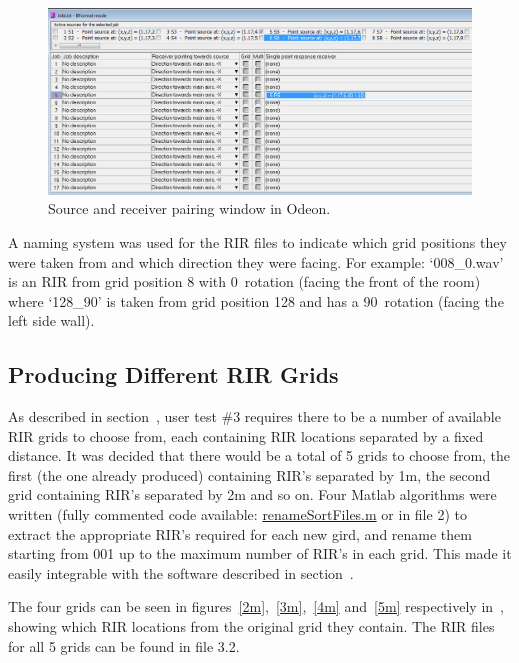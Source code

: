 \documentclass[../../main.tex]{subfiles}
\begin{document}
			\begin{figure}
				\centerline{\includegraphics[scale = 0.54]{Sections/Implementation/Odeon/images/SouRecPos/SouRecSelection_crop.png}}
				\caption{Source and receiver pairing window in Odeon.}
				\label{SouRecPos}
			\end{figure}

			A naming system was used for the \ac{RIR} files to indicate which grid positions they were taken from and which direction they were facing. For example: `008\_0.wav' is an \ac{RIR} from grid position 8 with 0\textdegree~rotation (facing the front of the room) where `128\_90' is taken from grid position 128 and has a 90\textdegree~rotation (facing the left side wall).

	\subsection{Producing Different RIR Grids}
	\label{odeon:grids}
		As described in section~, user test \#3 requires there to be a number of available \ac{RIR} grids to choose from, each containing \ac{RIR} locations separated by a fixed distance. It was decided that there would be a total of 5 grids to choose from, the first (the one already produced) containing \ac{RIR}'s separated by 1m, the second grid containing \ac{RIR}'s separated by 2m and so on.	 Four Matlab algorithms were written (fully commented code available: \href{http://lt669.github.io/code/matlab/html/renameSortFiles.html}{renameSortFiles.m} or in file 2) to extract the appropriate \ac{RIR}'s required for each new gird, and rename them starting from 001 up to the maximum number of \ac{RIR}'s in each grid. This made it easily integrable with the software described in section~.

		The four grids can be seen in figures~\ref{2m},~\ref{3m},~\ref{4m} and~\ref{5m} respectively in~, showing which \ac{RIR} locations from the original grid they contain. The \ac{RIR} files for all 5 grids can be found in file 3.2.
\end{document}
